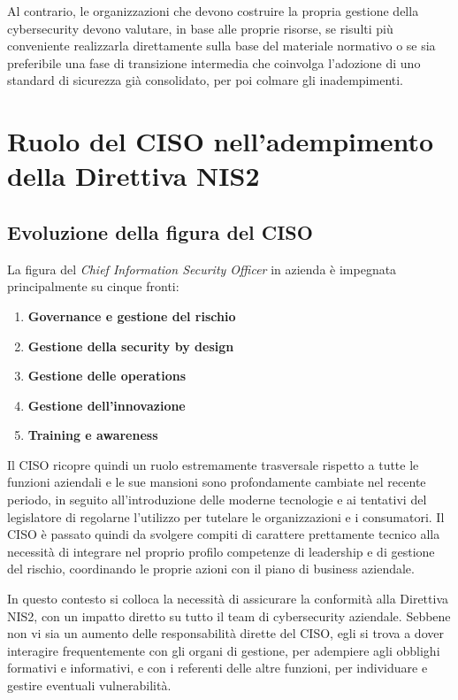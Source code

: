 Al contrario, le organizzazioni che devono costruire la propria gestione della cybersecurity devono valutare, in base alle proprie risorse, se risulti
più conveniente realizzarla direttamente sulla base del materiale normativo o se sia preferibile una fase di transizione intermedia che coinvolga
l'adozione di uno standard di sicurezza già consolidato, per poi colmare gli inadempimenti.



\section{Ruolo del CISO nell'adempimento della Direttiva NIS2}
\subsection{Evoluzione della figura del CISO}
La figura del \textit{Chief Information Security Officer} in azienda è impegnata principalmente su cinque fronti:
\begin{enumerate}
    \item \textbf{Governance e gestione del rischio}
    \item \textbf{Gestione della security by design}
    \item \textbf{Gestione delle operations}
    \item \textbf{Gestione dell'innovazione}
    \item \textbf{Training e awareness}
\end{enumerate}
Il CISO ricopre quindi un ruolo estremamente trasversale rispetto a tutte le funzioni aziendali e le sue mansioni sono profondamente
cambiate nel recente periodo, in seguito all'introduzione delle moderne tecnologie e ai tentativi del legislatore di regolarne l'utilizzo
per tutelare le organizzazioni e i consumatori. Il CISO è passato quindi da svolgere compiti di carattere prettamente tecnico alla necessità
di integrare nel proprio profilo competenze di leadership e di gestione del rischio, coordinando le proprie azioni con il piano di business aziendale.

In questo contesto si colloca la necessità di assicurare la conformità alla Direttiva NIS2, con un impatto diretto su tutto il team di cybersecurity aziendale.
Sebbene non vi sia un aumento delle responsabilità dirette del CISO, egli si trova a dover interagire frequentemente con gli organi di gestione, per adempiere
agli obblighi formativi e informativi, e con i referenti delle altre funzioni, per individuare e gestire eventuali vulnerabilità.


